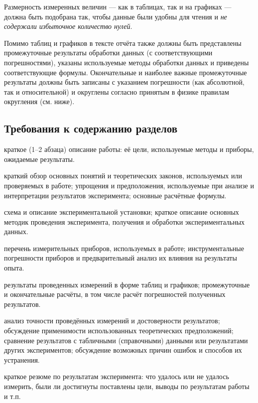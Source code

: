 Размерность измеренных величин --- как в таблицах, так и
на графиках --- должна быть подобрана так, чтобы данные
были удобны для чтения и \emph{не содержали избыточное количество
нулей}.

Помимо таблиц и графиков в тексте отчёта также должны быть представлены
промежуточные результаты обработки данных (с соответствующими погрешностями),
указаны используемые методы обработки данных и приведены соответствующие
формулы. Окончательные и наиболее важные промежуточные результаты
должны быть записаны с указанием погрешности (как абсолютной, так
и относительной) и округлены согласно принятым в физике правилам округления
(см. ниже).

\subsection{Требования к содержанию разделов}

\begin{description}[itemsep=0pt]\small
\item [{Аннотация:}] краткое (1--2 абзаца) описание работы: её
цели, используемые методы и приборы, ожидаемые результаты.
\item [{Теоретические~сведения:}] краткий обзор основных понятий и теоретических
законов, используемых или проверяемых в работе; упрощения и предположения,
используемые при анализе и интерпретации результатов эксперимента;
основные расчётные формулы.
\item [{Методика~измерений:}] схема и описание экспериментальной установки;
краткое описание основных методик проведения эксперимента, получения
и обработки экспериментальных данных.
\item [{Используемое~оборудование:}] перечень измерительных приборов,
используемых в работе; инструментальные погрешности приборов и предварительный
анализ их влияния на результаты опыта.
\item [{Результаты~измерений~и~обработка~данных:}] результаты проведенных
измерений в форме таблиц и графиков; промежуточные и окончательные
расчёты, в том числе расчёт погрешностей полученных результатов.
\item [{Обсуждение~результатов:}] анализ точности проведённых измерений
и достоверности результатов; обсуждение применимости использованных
теоретических предположений; сравнение результатов с табличными (справочными)
данными или результатами других экспериментов; обсуждение возможных
причин ошибок и способов их устранения.
\item [{Заключение~(или~выводы):}] краткое резюме по результатам эксперимента:
что удалось или не удалось измерить, были ли достигнуты поставлены
цели, выводы по результатам работы и т.п.
\end{description}

